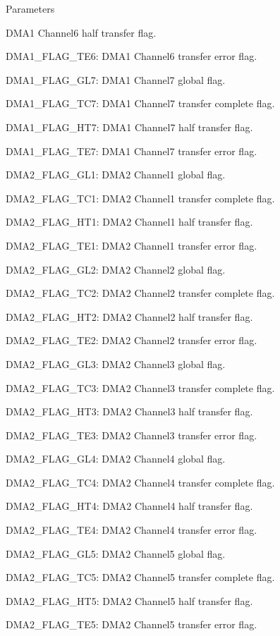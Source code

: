 \begin{DoxyParams}{Parameters}
\begin{DoxyItemize}
D\+M\+A1 Channel6 half transfer flag. \item D\+M\+A1\+\_\+\+F\+L\+A\+G\+\_\+\+T\+E6\+: D\+M\+A1 Channel6 transfer error flag. \item D\+M\+A1\+\_\+\+F\+L\+A\+G\+\_\+\+G\+L7\+: D\+M\+A1 Channel7 global flag. \item D\+M\+A1\+\_\+\+F\+L\+A\+G\+\_\+\+T\+C7\+: D\+M\+A1 Channel7 transfer complete flag. \item D\+M\+A1\+\_\+\+F\+L\+A\+G\+\_\+\+H\+T7\+: D\+M\+A1 Channel7 half transfer flag. \item D\+M\+A1\+\_\+\+F\+L\+A\+G\+\_\+\+T\+E7\+: D\+M\+A1 Channel7 transfer error flag. \item D\+M\+A2\+\_\+\+F\+L\+A\+G\+\_\+\+G\+L1\+: D\+M\+A2 Channel1 global flag. \item D\+M\+A2\+\_\+\+F\+L\+A\+G\+\_\+\+T\+C1\+: D\+M\+A2 Channel1 transfer complete flag. \item D\+M\+A2\+\_\+\+F\+L\+A\+G\+\_\+\+H\+T1\+: D\+M\+A2 Channel1 half transfer flag. \item D\+M\+A2\+\_\+\+F\+L\+A\+G\+\_\+\+T\+E1\+: D\+M\+A2 Channel1 transfer error flag. \item D\+M\+A2\+\_\+\+F\+L\+A\+G\+\_\+\+G\+L2\+: D\+M\+A2 Channel2 global flag. \item D\+M\+A2\+\_\+\+F\+L\+A\+G\+\_\+\+T\+C2\+: D\+M\+A2 Channel2 transfer complete flag. \item D\+M\+A2\+\_\+\+F\+L\+A\+G\+\_\+\+H\+T2\+: D\+M\+A2 Channel2 half transfer flag. \item D\+M\+A2\+\_\+\+F\+L\+A\+G\+\_\+\+T\+E2\+: D\+M\+A2 Channel2 transfer error flag. \item D\+M\+A2\+\_\+\+F\+L\+A\+G\+\_\+\+G\+L3\+: D\+M\+A2 Channel3 global flag. \item D\+M\+A2\+\_\+\+F\+L\+A\+G\+\_\+\+T\+C3\+: D\+M\+A2 Channel3 transfer complete flag. \item D\+M\+A2\+\_\+\+F\+L\+A\+G\+\_\+\+H\+T3\+: D\+M\+A2 Channel3 half transfer flag. \item D\+M\+A2\+\_\+\+F\+L\+A\+G\+\_\+\+T\+E3\+: D\+M\+A2 Channel3 transfer error flag. \item D\+M\+A2\+\_\+\+F\+L\+A\+G\+\_\+\+G\+L4\+: D\+M\+A2 Channel4 global flag. \item D\+M\+A2\+\_\+\+F\+L\+A\+G\+\_\+\+T\+C4\+: D\+M\+A2 Channel4 transfer complete flag. \item D\+M\+A2\+\_\+\+F\+L\+A\+G\+\_\+\+H\+T4\+: D\+M\+A2 Channel4 half transfer flag. \item D\+M\+A2\+\_\+\+F\+L\+A\+G\+\_\+\+T\+E4\+: D\+M\+A2 Channel4 transfer error flag. \item D\+M\+A2\+\_\+\+F\+L\+A\+G\+\_\+\+G\+L5\+: D\+M\+A2 Channel5 global flag. \item D\+M\+A2\+\_\+\+F\+L\+A\+G\+\_\+\+T\+C5\+: D\+M\+A2 Channel5 transfer complete flag. \item D\+M\+A2\+\_\+\+F\+L\+A\+G\+\_\+\+H\+T5\+: D\+M\+A2 Channel5 half transfer flag. \item D\+M\+A2\+\_\+\+F\+L\+A\+G\+\_\+\+T\+E5\+: D\+M\+A2 Channel5 transfer error flag. \end{DoxyItemize}

\end{DoxyParams}
